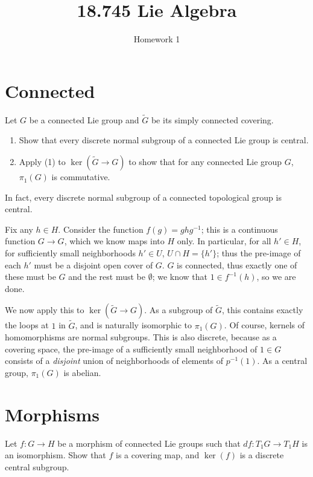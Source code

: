 \documentclass[11pt, headheight=30pt]{scrartcl}
\title{18.745 Lie Algebra}
\subtitle{Homework 1}
\begin{document}
\section{Connected}
\begin{prob}
    Let $G$ be a connected Lie group and $\tilde{G}$ be its simply connected covering.
    \begin{enumerate}
        \item Show that every discrete normal subgroup of a
        connected Lie group is central.
        \item Apply (1) to $\ker(\tilde{G} \to G)$ to show that
        for any connected Lie group $G$, $\pi_1(G)$ is commutative.
    \end{enumerate}
\end{prob}

In fact, every discrete normal subgroup of a connected topological group is central.

Fix any $h\in H$. Consider the function $f(g) = ghg^{-1}$;
this is a continuous function $G\to G$, which we know maps into $H$ only.
In particular, for all $h'\in H$, for sufficiently small neighborhoods
$h'\in U$, $U\cap H = \{h'\}$; thus the pre-image of each $h'$ must
be a disjoint open cover of $G$. $G$ is connected, thus exactly one
of these must be $G$ and the rest must be $\emptyset$; we
know that $1\in f^{-1}(h)$, so we are done.

We now apply this to $\ker(\tilde{G}\to G)$. As a subgroup of $\tilde{G}$,
this contains exactly the loops at $1$ in $\tilde{G}$, and is naturally
isomorphic to $\pi_1(G)$. Of course, kernels of homomorphisms are
normal subgroups. This is also discrete, because as a covering space,
the pre-image of a sufficiently small neighborhood of $1\in G$ consists
of a \emph{disjoint} union of neighborhoods of elements of $p^{-1}(1)$.
As a central group, $\pi_1(G)$ is abelian.

\section{Morphisms}
\begin{prob}
    Let $f: G\to H$ be a morphism of connected Lie groups such that
    $df: T_1G\to T_1H$ is an isomorphism.
    Show that $f$ is a covering map, and $\ker(f)$ is
    a discrete central subgroup.
\end{prob}
\end{document}
